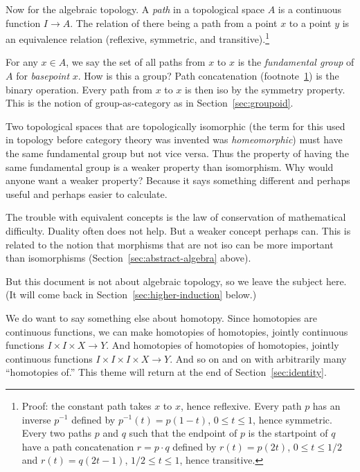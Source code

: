 \documentclass[11pt]{article}
\begin{document}
Now for the algebraic topology.  A \emph{path} in a topological space $A$
is a continuous function $I \to A$.  The relation of there being a path
from a point $x$ to a point $y$ is an equivalence relation (reflexive,
symmetric, and transitive).\footnote{Proof: the constant path takes $x$ to $x$,
hence reflexive.  Every path $p$ has an inverse $p^{-1}$ defined by
$p^{-1}(t) = p(1 - t)$, $0 \le t \le 1$, hence symmetric.  Every two paths $p$
and $q$ such that the endpoint of $p$ is the startpoint of $q$ have a
path concatenation $r = p \cdot q$
defined by $r(t) = p(2 t)$, $0 \le t \le 1/2$
and $r(t) = q(2 t - 1)$, $1 / 2 \le t \le 1$,
hence transitive.\label{foot:refl-sym-trans}}

For any $x \in A$, we say the set of all paths from $x$ to $x$ is the
\emph{fundamental group} of $A$ for \emph{basepoint} $x$.  How is this
a group?  Path concatenation (footnote~\ref{foot:refl-sym-trans})
is the binary operation.  Every path from
$x$ to $x$ is then iso by the symmetry property.  This is the
notion of group-as-category as in Section~\ref{sec:groupoid}.

Two topological spaces that are topologically isomorphic (the term
for this used in topology before category theory was invented was
\emph{homeomorphic}) must have the same fundamental group but not
vice versa.  Thus the property of having the same fundamental group
is a weaker property than isomorphism.
Why would anyone want a weaker property?  Because it says something
different and perhaps useful and perhaps easier to calculate.

The trouble with equivalent concepts is the law of conservation of
mathematical difficulty.  Duality often does not help.
But a weaker concept perhaps can.
This is related to the notion that morphisms that are not iso can be
more important than isomorphisms (Section~\ref{sec:abstract-algebra} above).

But this document is not about algebraic topology, so we leave the subject
here.  (It will come back in Section~\ref{sec:higher-induction} below.)

We do want to say something else about homotopy.
Since homotopies are continuous functions, we can make homotopies
of homotopies, jointly continuous functions $I \times I \times X \to Y$.
And homotopies of homotopies of homotopies,
jointly continuous functions $I \times I \times I \times X \to Y$.
And so on and on with arbitrarily many ``homotopies of.''
This theme will return at the end of Section~\ref{sec:identity}.
\end{document}
